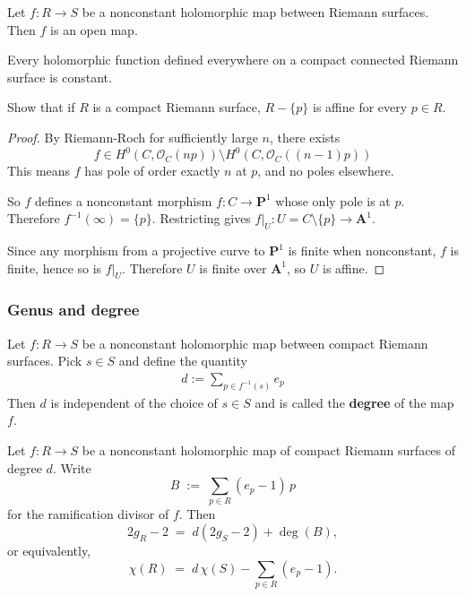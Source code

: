 \documentclass[12pt]{article}
\begin{document}
\begin{corollary}
    Let $f : R \to S$ be a nonconstant holomorphic map between Riemann surfaces.
    Then $f$ is an open map.
\end{corollary}

\begin{corollary}
    Every holomorphic function defined everywhere on a compact connected Riemann surface is constant.
\end{corollary}

\begin{exercise}
    Show that if $R$ is a compact Riemann surface, $R - \{p\}$ is affine for every $p \in R$.
\end{exercise}

\begin{proof}
    By Riemann-Roch for sufficiently large $n$, there exists \[f\in H^0(C,\mathcal O_C(np)) \setminus H^0(C,\mathcal O_C((n-1)p))\] This means $f$ has pole of order exactly $n$ at $p$, and no poles elsewhere.

    So $f$ defines a nonconstant morphism $f:C\to \mathbf P^1$
    whose only pole is at $p$. Therefore $f^{-1}(\infty)=\{p\}$.
    Restricting gives $f|_U:U=C\setminus\{p\}\to \mathbf A^1$.

    Since any morphism from a projective curve to $\mathbf P^1$ is finite when nonconstant, $f$ is finite, hence so is $f|_U$. Therefore $U$ is finite over $\mathbf A^1$, so $U$ is affine.
\end{proof}

\subsubsection{Genus and degree}

\begin{theorem}
    Let $f : R \to S$ be a nonconstant holomorphic map between compact Riemann surfaces. Pick $s\in S$ and define the quantity \begin{align*}
        d := \sum_{p \in f^{-1}(s)} e_p
    \end{align*}
    Then $d$ is independent of the choice of $s \in S$ and is called the \textbf{degree} of the map $f$.
\end{theorem}

\begin{theorem}
    Let $f : R \to S$ be a nonconstant holomorphic map of compact Riemann
    surfaces of degree $d$.  Write
    \[
        B \;:=\; \sum_{p\in R} (e_p - 1)\,p
    \]
    for the ramification divisor of $f$. Then
    \[
        2g_R - 2 \;=\; d(2g_S - 2) + \deg(B),
    \]
    or equivalently,
    \[
        \chi(R) \;=\; d\,\chi(S) - \sum_{p\in R}(e_p - 1).
    \]
\end{theorem}
\end{document}

